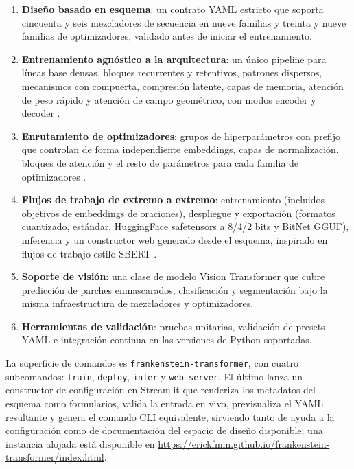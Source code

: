 \begin{enumerate}[leftmargin=*]
    \item \textbf{Diseño basado en esquema}: un contrato YAML estricto que soporta cincuenta y seis mezcladores de secuencia en nueve familias y treinta y nueve familias de optimizadores, validado antes de iniciar el entrenamiento.
    \item \textbf{Entrenamiento agnóstico a la arquitectura}: un único pipeline para líneas base densas, bloques recurrentes y retentivos, patrones dispersos, mecanismos con compuerta, compresión latente, capas de memoria, atención de peso rápido y atención de campo geométrico, con modos encoder y decoder \citep{zhu2026mixtureofdepthsattention,cheng2026conditionalmemoryscalablelookup,xie_mhc_2025,zhang_falcon_2026,pisoni_ssog_2026}.
    \item \textbf{Enrutamiento de optimizadores}: grupos de hiperparámetros con prefijo que controlan de forma independiente embeddings, capas de normalización, bloques de atención y el resto de parámetros para cada familia de optimizadores \citep{zhu2025apollosgdlikememoryadamwlevel}.
    \item \textbf{Flujos de trabajo de extremo a extremo}: entrenamiento (incluidos objetivos de embeddings de oraciones), despliegue y exportación (formatos cuantizado, estándar, HuggingFace safetensors a 8/4/2 bits y BitNet GGUF), inferencia y un constructor web generado desde el esquema, inspirado en flujos de trabajo estilo SBERT \citep{reimers_sentence-bert_2019}.
    \item \textbf{Soporte de visión}: una clase de modelo Vision Transformer que cubre predicción de parches enmascarados, clasificación y segmentación bajo la misma infraestructura de mezcladores y optimizadores.
    \item \textbf{Herramientas de validación}: pruebas unitarias, validación de presets YAML e integración continua en las versiones de Python soportadas.
\end{enumerate}

La superficie de comandos es \texttt{frankenstein-transformer}, con cuatro subcomandos: \texttt{train}, \texttt{deploy}, \texttt{infer} y \texttt{web-server}. El último lanza un constructor de configuración en Streamlit que renderiza los metadatos del esquema como formularios, valida la entrada en vivo, previsualiza el YAML resultante y genera el comando CLI equivalente, sirviendo tanto de ayuda a la configuración como de documentación del espacio de diseño disponible; una instancia alojada está disponible en \url{https://erickfmm.github.io/frankenstein-transformer/index.html}.

